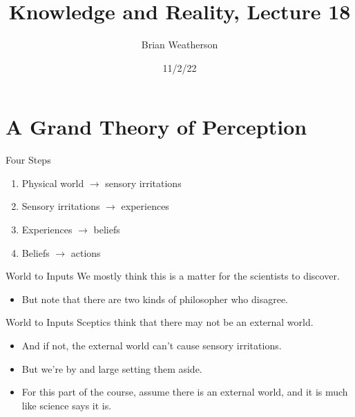 \documentclass[
  17pt,
  letterpaper,
  ignorenonframetext,
  aspectratio=169,
  xcolor={dvipsnames}]{beamer}
\title{Knowledge and Reality, Lecture 18}
\author{Brian Weatherson}
\date{11/2/22}
\providecommand{\tightlist}{%
  \setlength{\itemsep}{0pt}\setlength{\parskip}{0pt}}\usepackage{longtable,booktabs,array}
\begin{document}
\frame{\titlepage}
\ifdefined\Shaded\renewenvironment{Shaded}{\begin{tcolorbox}[boxrule=0pt, frame hidden, interior hidden, borderline west={3pt}{0pt}{shadecolor}, sharp corners, enhanced, breakable]}{\end{tcolorbox}}\fi

\hypertarget{a-grand-theory-of-perception}{%
\section{A Grand Theory of
Perception}\label{a-grand-theory-of-perception}}

\begin{frame}{Four Steps}
\protect\hypertarget{four-steps}{}
\begin{enumerate}[<+->]
\tightlist
\item
  Physical world \(\rightarrow\) sensory irritations
\item
  Sensory irritations \(\rightarrow\) experiences
\item
  Experiences \(\rightarrow\) beliefs
\item
  Beliefs \(\rightarrow\) actions
\end{enumerate}
\end{frame}

\begin{frame}{World to Inputs}
\protect\hypertarget{world-to-inputs}{}
We mostly think this is a matter for the scientists to discover.

\begin{itemize}[<+->]
\tightlist
\item
  But note that there are two kinds of philosopher who disagree.
\end{itemize}
\end{frame}

\begin{frame}{World to Inputs}
\protect\hypertarget{world-to-inputs-1}{}
Sceptics think that there may not be an external world.

\begin{itemize}[<+->]
\tightlist
\item
  And if not, the external world can't cause sensory irritations.
\item
  But we're by and large setting them aside.
\item
  For this part of the course, assume there is an external world, and it
  is much like science says it is.
\end{itemize}
\end{frame}
\end{document}
